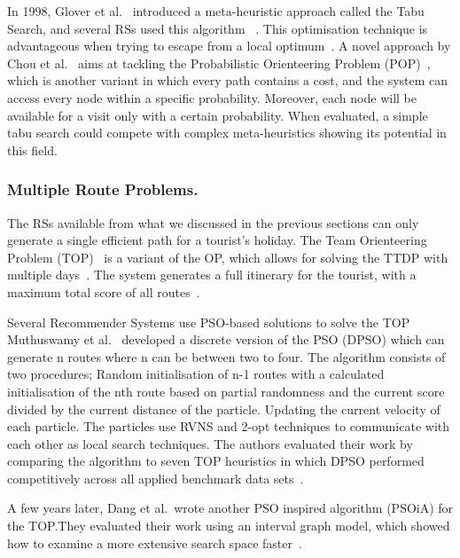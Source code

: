 In 1998, Glover et al.~\cite{Glover1998} introduced a meta-heuristic approach called the
Tabu Search, and several RSs used this algorithm
~\cite{Tang2005,Sylejmani2012,Chou2021}. This optimisation technique is
advantageous when trying to escape
from a local optimum~\cite{Chou2021}. A novel approach by Chou et al.~\cite{Chou2021} aims at
tackling the Probabilistic Orienteering Problem (POP)~\cite{Angelelli2017}, which
is another variant in which every path contains a cost, and the system can
access every node within a specific probability. Moreover, each node will be
available for a visit only with a certain probability. When evaluated, a simple
tabu search could compete with complex meta-heuristics showing its potential in
this field.



\subsubsection{Multiple Route Problems.}

The RSs available from what we discussed in the previous sections can only
generate a single efficient path for a tourist's holiday. The Team Orienteering
Problem (TOP)~\cite{Chao1996} is a variant of the OP, which allows for
solving the TTDP with multiple days~\cite{Sylejmani2017}. The system generates a full
itinerary for the tourist, with a maximum total score of all routes~\cite{Herzog2020}.

Several Recommender Systems use PSO-based solutions to solve the TOP
~\cite{Muthuswamy2011,Wisittipanich2020,Yu2019}
Muthuswamy et al.~\cite{Muthuswamy2011} developed a discrete version of the PSO (DPSO)
which can generate n routes
where n can be between two to four. The algorithm consists of two procedures;
Random initialisation of n-1 routes with a calculated initialisation of the nth
route based on partial randomness and the current score divided by the current
distance of the particle.  Updating the current velocity of each particle.  The
particles use RVNS and 2-opt techniques to communicate with each other as local
search techniques. The authors evaluated their work by comparing the algorithm
to seven TOP heuristics in which DPSO performed competitively across all
applied benchmark data sets~\cite{Gavalas2014a}.

A few years later, Dang et al.\ wrote another PSO inspired algorithm (PSOiA) for
the TOP.\@ They evaluated their work using an interval graph model, which showed
how to examine a more extensive search space faster~\cite{Gunawan2016}.

